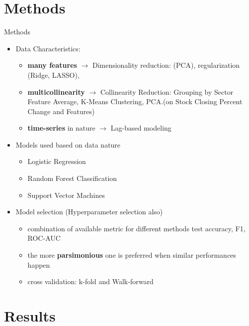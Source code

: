 \documentclass[aspectratio=43]{beamer} %
\begin{document}

\section{Methods}
\begin{frame}{Methods}
\begin{itemize}
  \item Data Characteristics: 
  \begin{itemize}
    \item \textbf{many features} $\to$ Dimensionality reduction: (PCA), regularization (Ridge, LASSO), 
    \item  \textbf{multicollinearity} $\to$ Collinearity Reduction: Grouping by Sector Feature Average, K-Means Clustering, PCA.(on Stock Closing Percent Change and Features)
    \item \textbf{time-series} in nature $\to$ Lag-based modeling
  \end{itemize}
  \item Models used based on data nature
  \begin{itemize}
    \item Logistic Regression
    \item Random Forest Classification
    \item Support Vector Machines
  \end{itemize}
  \item Model selection (Hyperparameter selection also)
  \begin{itemize}
    \item combination of available metric for different methods test accuracy, F1, ROC-AUC
    \item the more \textbf{parsimonious} one is preferred when similar performances happen
    \item cross validation: k-fold and Walk-forward
  \end{itemize}
\end{itemize}
\end{frame}



\section{Results}
\end{document}
